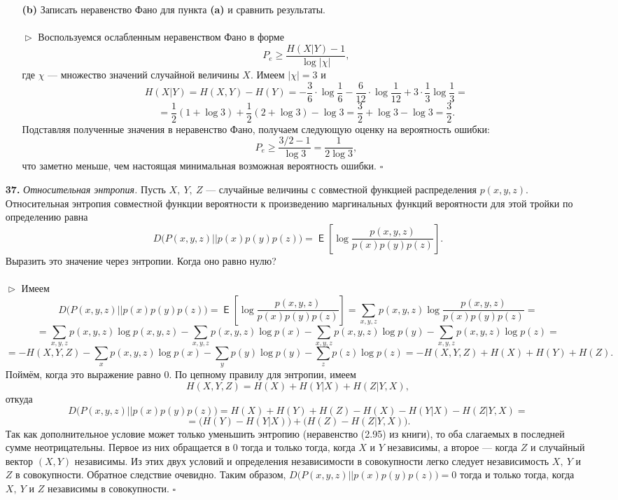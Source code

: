 \documentclass{article}
\DeclareMathOperator{\E}{\mathsf{E}}
\renewcommand{\ge}{\geqslant}
\begin{document}
\begin{enumerate}
\begin{enumerate}
\\\\
\item[\bfseries (b)] Записать неравенство Фано для пункта {\bfseries (a)} и сравнить результаты.
\\\\$\vartriangleright$ Воспользуемся ослабленным неравенством Фано в форме 
$$P_e \ge \frac{H(X|Y) - 1}{\log |\chi|},$$
где $\chi$ --- множество значений случайной величины $X$. Имеем $|\chi| = 3$ и $$H(X|Y) = H(X, Y) - H(Y) = -\frac{3}{6} \cdot \log\frac{1}{6} - \frac{6}{12} \cdot \log\frac{1}{12} + 3 \cdot \frac{1}{3}\log\frac{1}{3} =$$
$$= \frac{1}{2}(1 + \log 3) + \frac{1}{2}(2 + \log 3) - \log 3 = \frac{3}{2} + \log 3 - \log 3 = \frac{3}{2}.$$
Подставляя полученные значения в неравенство Фано, получаем следующую оценку на вероятность ошибки:
$$P_e \ge \frac{3/2 - 1}{\log 3} = \frac{1}{2\log 3},$$
что заметно меньше, чем настоящая минимальная возможная вероятность ошибки. $\square$
\\
\end{enumerate} 
\item[\bfseries 37.] \textit{Относительная энтропия.} Пусть $X,\ Y,\ Z$ --- случайные величины с совместной функцией распределения $p(x, y, z).$ Относительная энтропия совместной функции вероятности к произведению маргинальных функций вероятности для этой тройки по определению равна
$$D\Big(P(x, y, z)||p(x)p(y)p(z)\Big) = \E \left[\log \frac{p(x, y, z)}{p(x)p(y)p(z)}\right].$$
Выразить это значение через энтропии. Когда оно равно нулю?
\\\\$\vartriangleright$ Имеем
$$D\Big(P(x, y, z)||p(x)p(y)p(z)\Big) = \E \left[\log \frac{p(x, y, z)}{p(x)p(y)p(z)}\right] = \sum_{x, y, z} p(x, y, z)\log \frac{p(x, y, z)}{p(x)p(y)p(z)} =$$
$$= \sum_{x, y, z} p(x, y, z)\log p(x, y, z) - \sum_{x, y, z} p(x, y, z)\log p(x) - \sum_{x, y, z} p(x, y, z)\log p(y) -\sum_{x, y, z} p(x, y, z)\log p(z) = $$
$$=-H(X, Y, Z) - \sum_{x} p(x, y, z)\log p(x) - \sum_{y} p(y)\log p(y) - \sum_{z} p(z)\log p(z) = -H(X, Y, Z) + H(X) + H(Y) + H(Z).$$
Поймём, когда это выражение равно $0$.
По цепному правилу для энтропии, имеем
$$H(X, Y, Z) = H(X) + H(Y|X) + H(Z|Y, X),$$ откуда
$$D\Big(P(x, y, z)||p(x)p(y)p(z)\Big) = H(X) + H(Y) + H(Z) - H(X) - H(Y|X) - H(Z|Y, X) = $$
$$=\Big(H(Y) - H(Y|X)\Big) + \Big(H(Z) - H(Z|Y, X)\Big).$$
Так как дополнительное условие может только уменьшить энтропию (неравенство (2.95) из книги), то оба слагаемых в последней сумме неотрицательны. Первое из них обращается в $0$ тогда и только тогда, когда $X$ и $Y$ независимы, а второе --- когда $Z$ и случайный вектор $(X, Y)$ независимы. Из этих двух условий и определения независимости в совокупности легко следует независимость $X,\ Y$ и $Z$ в совокупности. Обратное следствие очевидно. Таким образом, $D\Big(P(x, y, z)||p(x)p(y)p(z)\Big) = 0$ тогда и только тогда, когда $X,\ Y$ и $Z$ независимы в совокупности. $\square$

\end{enumerate}
\end{document}

